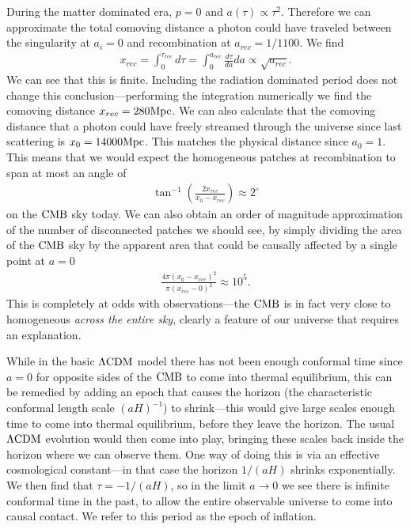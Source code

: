     During the matter dominated era, $p=0$ and
    $a(\tau)\propto \tau^2$. Therefore we can approximate
    the total comoving distance a photon could have traveled between the singularity at $a_i=0$
    and recombination at $a_{rec}=1/1100$. We find
    \begin{align}
        x_{rec} = \int_{0}^{\tau_{rec}} d \tau = \int_{0}^{a_{rec}} \frac{d\tau}{da}da \propto \sqrt{a_{rec}}.
    \end{align}
    We can see that this is finite.
    Including the radiation dominated period does not change this conclusion---performing
    the integration numerically we find the comoving distance $x_{rec}=280\text{Mpc}$.
    We can also calculate that the comoving distance that a photon could have
    freely streamed through the universe since
    last scattering is $x_0=14000\text{Mpc}$. This matches the physical distance
    since $a_0=1$.
    This means that we would expect the homogeneous patches at recombination to span
    at most an angle of
    \begin{align}
        \tan^{-1}\left(\frac{2x_{rec}}{x_{0}-x_{rec}}\right) \approx 2^{\circ}
    \end{align}
    on the $\text{CMB}$ sky today.
    We can also obtain an order of magnitude approximation of the number of disconnected patches
    we should see, by simply dividing the area of the $\text{CMB}$ sky by the apparent
    area that could be causally affected by a single point at $a=0$
    \begin{align}
        \frac{4\pi(x_{0}-x_{rec})^2}{\pi(x_{rec}-0)^2} \approx 10^5.
    \end{align}
    This is completely at odds with observations---the $\text{CMB}$ is in fact very close to
    homogeneous \textit{across the entire sky}, clearly a feature of our universe
    that requires an explanation.


    While in the basic $\Lambda\text{CDM}$ model there has not been enough conformal time since $a=0$ for
    opposite sides of the $\text{CMB}$ to come into thermal equilibrium, this can be remedied by
    adding an epoch that causes the horizon (the characteristic conformal length scale $(aH)^{-1}$)
    to shrink---this would give large scales enough time
    to come into thermal equilibrium, before they leave the horizon. The usual $\Lambda\text{CDM}$ evolution
    would then come into play, bringing these scales back inside the horizon where we can observe them.
    One way of doing this is via an effective cosmological constant---in that case the horizon $1/(aH)$ shrinks
    exponentially. We then find that $\tau=-1/(aH)$, so in the limit $a\rightarrow 0$ we see there is
    infinite conformal time in the past, to allow the entire observable universe to come into
    causal contact. We refer to this period as the epoch of inflation.


